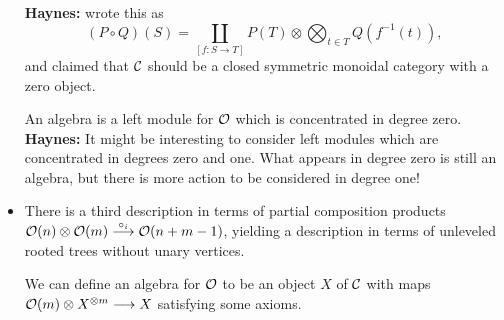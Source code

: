 \documentclass[11pt]{article}
\begin{document}
\begin{LuisKoszulDuality}
\begin{itemize}
\textbf{Haynes:} wrote this as
\[(P\circ Q)(S)=
\coprod_{[f:S\to T]}P(T)\otimes\bigotimes_{t\in T}Q(f^{-1}(t)),\]
and claimed that $\mathcal{C}$ should be a closed symmetric monoidal category with a zero object.

An algebra is a left module for $\mathcal{O}$ which is concentrated in degree zero. \textbf{Haynes:} It might be interesting to consider left modules which are concentrated in degrees zero and one. What appears in degree zero is still an algebra, but there is more action to be considered in degree one!

\item There is a third description in terms of partial composition products $\mathcal{O}(n)\otimes\mathcal{O}(m)\overset{\circ_i}{\longrightarrow}\mathcal{O}(n+m-1)$, yielding a description in terms of unleveled rooted trees without unary vertices.

We can define an algebra for $\mathcal{O}$ to be an object $X$ of $\mathcal{C}$ with maps $\mathcal{O}(m)\otimes X^{\otimes m}\longrightarrow X$ satisfying some axioms.
\end{itemize}











\pagebreak
\end{LuisKoszulDuality}
\end{document}
